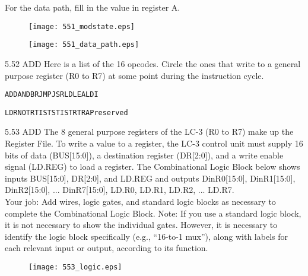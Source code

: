 \documentclass{patt}
\begin{document}
\begin{exercises}
\noindent
For the data path, fill in the value in register A.\\

\begin{figure}[h]
\centering
\texttt{[image: 551\_modstate.eps]}
\end{figure}

\newpage 

\begin{figure}[h]
\centering
\texttt{[image: 551\_data\_path.eps]}
\end{figure}

\FloatBarrier 

\item[5.52]ADD Here is a list of the 16 opcodes. Circle the ones that 
write to a general purpose register (R0 to R7) at some point during the instruction cycle.

\begin{alltt}
           ADD      AND      BR      JMP      JSR      LD      LEA      LDI

           LDR      NOT      RTI     ST       STI      STR     TRAP     reserved
\end{alltt}

\vspace{0.1in}

\item[5.53]ADD The 8 general purpose registers of the LC-3 (R0 to R7) make up the
Register File. To write a value to a register, the LC-3 control unit must supply 16 bits of data (BUS[15:0]), a destination register (DR[2:0]), and a write enable signal (LD.REG) to load a register.  The Combinational Logic Block below shows inputs BUS[15:0], DR[2:0], and LD.REG and outputs DinR0[15:0], DinR1[15:0], DinR2[15:0], ... DinR7[15:0], LD.R0, LD.R1, LD.R2, ... LD.R7.\\

\noindent Your job: Add wires, logic gates, and standard logic blocks as necessary to complete the Combinational Logic Block.  Note: If you use a standard logic block, it is not necessary to show the individual gates.  However, it is necessary to identify the logic block specifically (e.g., ``16-to-1 mux''), along with labels for each relevant input or output, according to its function.\\

\begin{figure}[h]
\centering
\texttt{[image: 553\_logic.eps]}
\end{figure}

\FloatBarrier


\end{exercises}
\end{document}
